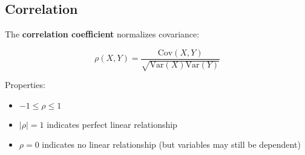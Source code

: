 \subsection{Correlation}

The \textbf{correlation coefficient} normalizes covariance:

\begin{equation}
\rho(X, Y) = \frac{\text{Cov}(X, Y)}{\sqrt{\text{Var}(X)\text{Var}(Y)}}
\end{equation}

Properties:
\begin{itemize}
    \item $-1 \leq \rho \leq 1$
    \item $|\rho| = 1$ indicates perfect linear relationship
    \item $\rho = 0$ indicates no linear relationship (but variables may still be dependent)
\end{itemize}
